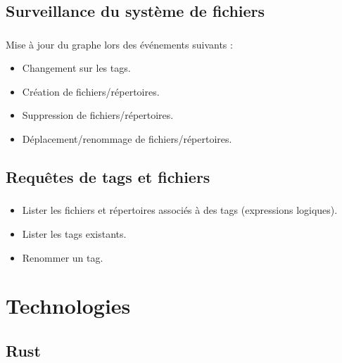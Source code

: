 \documentclass[10pt]{beamer}
\begin{document}
\subsection{Surveillance du système de fichiers}
\begin{frame}
    \frametitle{\subsecname}
    Mise à jour du graphe lors des événements suivants :
    \bigbreak
    \pause
    \begin{itemize}
        \item Changement sur les tags.
        \pause
        \item Création de fichiers/répertoires.
        \pause
        \item Suppression de fichiers/répertoires.
        \pause
        \item Déplacement/renommage de fichiers/répertoires.
    \end{itemize}
\end{frame}

\subsection{Requêtes de tags et fichiers}
\begin{frame}
    \frametitle{\subsecname}
    \begin{itemize}
        \pause
        \item Lister les fichiers et répertoires associés à des tags (expressions logiques).
        \pause
        \item Lister les tags existants.
        \pause
        \item Renommer un tag.
    \end{itemize}
\end{frame}

\section{Technologies}
\subsection{Rust}
\end{document}
